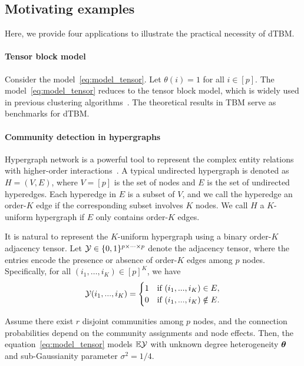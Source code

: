 \documentclass[lettersize,onecolumn,journal]{IEEEtran}
\theoremstyle{definition}
\theoremstyle{definition}
\begin{document}
\subsection{Motivating examples} Here, we provide four applications to illustrate the practical necessity of dTBM.

\vspace{0.2cm}
\paragraph{Tensor block model} Consider the model~\eqref{eq:model_tensor}. Let $\theta(i)=1$ for all $ i \in [p]$. The model~\eqref{eq:model_tensor} reduces to the tensor block model, which is widely used in previous clustering algorithms~\citep{wang2019multiway,chi2020provable,han2020exact}. The theoretical results in TBM serve as benchmarks for dTBM.  

\vspace{0.2cm}

\paragraph{Community detection in hypergraphs} Hypergraph network is a powerful tool to represent the complex entity relations with higher-order interactions~\citep{ke2019community}. A typical undirected hypergraph is denoted as $H = (V,E)$, where $V = [p]$ is the set of nodes and $E$ is the set of undirected hyperedges. Each hyperedge in $E$ is a subset of $V$, and we call the hyperedge an order-$K$ edge if the corresponding subset involves $K$ nodes. We call $H$ a $K$-uniform hypergraph if $E$ only contains order-$K$ edges. 

It is natural to represent the $K$-uniform hypergraph using a binary order-$K$ adjacency tensor. Let $\mathcal{Y} \in \{0,1\}^{p \times \cdots \times p}$ denote the adjacency tensor, where the entries encode the presence or absence of order-$K$ edges among $p$ nodes. Specifically, for all $(i_1,\ldots,i_K) \in [p]^K$, we have
\begin{equation}
    \mathcal{Y}(i_1,...,i_K) =  \begin{cases}
    1  & \text{if }  (i_1,...,i_K) \in E,\\
    0 & \text{if }  (i_1,...,i_K) \notin E.
    \end{cases}
\end{equation}


Assume there exist $r$ disjoint communities among $p$ nodes, and the connection probabilities depend on the community assignments and node effects. 
Then, the equation~\eqref{eq:model_tensor} models $\mathbb{E} \mathcal{Y}$ with unknown degree heterogeneity $\boldsymbol{\theta}$ and sub-Gaussianity parameter $\sigma^2 = 1/4$.  
\end{document}
